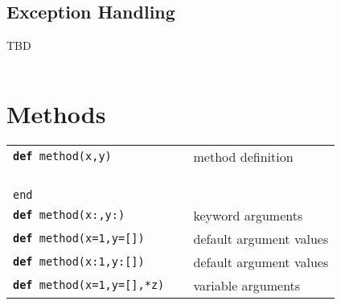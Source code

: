 \documentclass[6pt]{article}
\begin{document}
\begin{multicols}{3}
  \subsection{Exception Handling}
  TBD
  \begin{tabular}{L{0.55\linewidth} L{0.45\linewidth}}
  \end{tabular}

  \section{Methods}
  \begin{tabular}{L{0.55\linewidth} L{0.45\linewidth}}
    \tt \textbf{def} method(x,y)      & method definition \\
    \tt ~~                                 \\
    \tt end                                               \\
    \tt \textbf{def} method(x:,y:)      & keyword arguments \\
    \tt \textbf{def} method(x=1,y=[]) & default argument values    \\
    \tt \textbf{def} method(x:1,y:[]) & default argument values    \\
    \tt \textbf{def} method(x=1,y=[],*z) & variable arguments \\
  \end{tabular}


\end{multicols}
\end{document}
